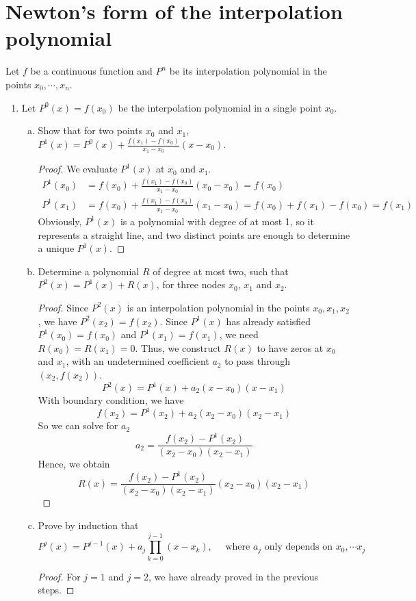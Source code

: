 \section{Newton's form of the interpolation polynomial}
Let $f$ be a continuous function and $P^n$ be its interpolation polynomial in the points \(x_0,\cdots,x_n\).
\begin{enumerate}
	\item Let \(P^0(x)=f(x_0)\) be the interpolation polynomial in a single point $x_0$.
	\begin{enumerate}[(a)]
		\item Show that for two points $x_0$ and $x_1$, \(P^1(x)=P^0(x)+\frac{f(x_1)-f(x_0)}{x_1-x_0}(x-x_0)\).
		\begin{proof}
		We evaluate \(P^1(x)\) at $x_0$ and $x_1$.
		\begin{align*}
		P^1(x_0)&=f(x_0)+\frac{f(x_1)-f(x_0)}{x_1-x_0}(x_0-x_0)=f(x_0)\\
		P^1(x_1)&=f(x_0)+\frac{f(x_1)-f(x_0)}{x_1-x_0}(x_1-x_0)=f(x_0)+f(x_1)-f(x_0)=f(x_1)
		\end{align*}
		Obviously, \(P^1(x)\) is a polynomial with degree of at most 1, so it represents a straight line, and two distinct points are enough to determine a unique \(P^1(x)\).
		\end{proof}
		\item Determine a polynomial $R$ of degree at most two, such that \( P^2(x)=P^1(x)+R(x) \), for three nodes $x_0$, $x_1$ and $x_2$.
		\begin{proof}
		Since \(P^2(x)\) is an interpolation polynomial in the points \(x_0,x_1,x_2\), we have \(P^2(x_2)=f(x_2)\).
		Since \(P^1(x)\) has already satisfied \(P^1(x_0)=f(x_0)\) and \(P^1(x_1)=f(x_1)\), we need \(R(x_0)=R(x_1)=0\).
		Thus, we construct \(R(x)\) to have zeros at $x_0$ and $x_1$, with an undetermined coefficient $a_2$ to pass through \((x_2,f(x_2))\).
		\[ P^2(x)=P^1(x)+a_2(x-x_0)(x-x_1) \]
		With boundary condition, we have
		\[ f(x_2)=P^1(x_2)+a_2(x_2-x_0)(x_2-x_1) \]
		So we can solve for $a_2$
		\[ a_2=\frac{f(x_2)-P^1(x_2)}{(x_2-x_0)(x_2-x_1)} \]
		Hence, we obtain
		\[ R(x)=\frac{f(x_2)-P^1(x_2)}{(x_2-x_0)(x_2-x_1)}(x_2-x_0)(x_2-x_1) \]
		\end{proof}
		\item Prove by induction that
		\[ P^j(x)=P^{j-1}(x)+a_j\prod_{k=0}^{j-1}(x-x_k), \quad \textrm{ where } a_j \textrm{ only depends on } x_0,\cdots x_j \]
		\begin{proof}
		For \(j=1\) and \(j=2\), we have already proved in the previous steps.

\end{proof}
\end{enumerate}
\end{enumerate}

